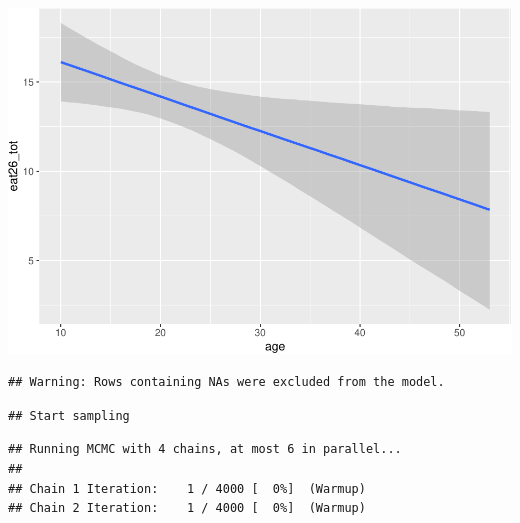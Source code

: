 \documentclass[
]{article}
\newenvironment{Shaded}{\begin{snugshade}}{\end{snugshade}}
\newcommand{\AttributeTok}[1]{\textcolor[rgb]{0.77,0.63,0.00}{#1}}
\newcommand{\CommentTok}[1]{\textcolor[rgb]{0.56,0.35,0.01}{\textit{#1}}}
\newcommand{\DecValTok}[1]{\textcolor[rgb]{0.00,0.00,0.81}{#1}}
\newcommand{\FloatTok}[1]{\textcolor[rgb]{0.00,0.00,0.81}{#1}}
\newcommand{\FunctionTok}[1]{\textcolor[rgb]{0.00,0.00,0.00}{#1}}
\newcommand{\NormalTok}[1]{#1}
\newcommand{\OtherTok}[1]{\textcolor[rgb]{0.56,0.35,0.01}{#1}}
\newcommand{\SpecialCharTok}[1]{\textcolor[rgb]{0.00,0.00,0.00}{#1}}
\newcommand{\StringTok}[1]{\textcolor[rgb]{0.31,0.60,0.02}{#1}}
\begin{document}
\includegraphics{050_quest_groups_files/figure-latex/unnamed-chunk-2-6.pdf}

\begin{Shaded}
\end{Shaded}

\begin{verbatim}
## Warning: Rows containing NAs were excluded from the model.
\end{verbatim}

\begin{verbatim}
## Start sampling
\end{verbatim}

\begin{verbatim}
## Running MCMC with 4 chains, at most 6 in parallel...
## 
## Chain 1 Iteration:    1 / 4000 [  0%]  (Warmup) 
## Chain 2 Iteration:    1 / 4000 [  0%]  (Warmup)
\end{verbatim}
\end{document}
